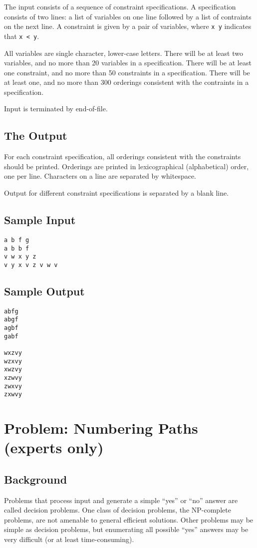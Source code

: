 The input consists of a sequence of constraint specifications.  A
specification consists of two lines: a list of variables on one line
followed by a list of contraints on the next line.  A constraint is
given by a pair of variables, 
where \verb!x y! indicates that \verb!x < y!.

All variables are single character, lower-case letters.  There will be
at least two variables, and no more than 20 variables in a specification.
There will be at least one constraint, and no more than 50 constraints
in a specification.  There will be at least one, and no more than 300
orderings consistent with the contraints in a specification.

Input is terminated by end-of-file.

\subsection*{The Output}

For each constraint specification, all orderings consistent with
the constraints should be printed.   
Orderings are printed in lexicographical (alphabetical) order, one per
line.  Characters on a line are separated by whitespace.

Output for different constraint specifications is separated by a blank line.

\clearpage
\subsection*{Sample Input}
\begin{verbatim}
a b f g
a b b f
v w x y z
v y x v z v w v
\end{verbatim}


\subsection*{Sample Output}
\begin{verbatim}
abfg
abgf
agbf
gabf

wxzvy
wzxvy
xwzvy
xzwvy
zwxvy
zxwvy
\end{verbatim}


\clearpage
\section{Problem: Numbering Paths (experts only)}

\subsection*{Background}
Problems that process input and generate a simple ``yes'' or ``no''
answer are called decision problems.  One class of decision problems,
the NP-complete problems, are not amenable to general efficient
solutions.  Other problems may be simple as decision problems, but
enumerating all possible ``yes'' answers may be very difficult (or at
least time-consuming).

